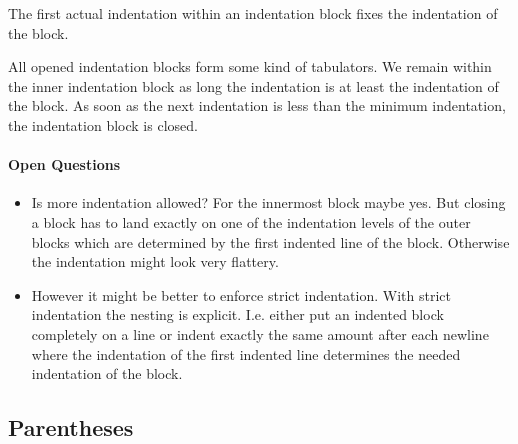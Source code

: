 The first actual indentation within an indentation block fixes the indentation
of the block.

All opened indentation blocks form some kind of tabulators. We remain within
the inner indentation block as long the indentation is at least the
indentation of the block. As soon as the next indentation is less than the
minimum indentation, the indentation block is closed.


\paragraph{Open Questions}
\begin{itemize}
\item Is more indentation allowed? For the innermost block maybe yes. But
  closing a block has to land exactly on one of the indentation levels of the
  outer blocks which are determined by the first indented line of the
  block. Otherwise the indentation might look very flattery.

\item
  However it might be better to enforce strict indentation. With strict
  indentation the nesting is explicit. I.e. either put an indented block
  completely on a line or indent exactly the same amount after each newline
  where the indentation of the first indented line determines the needed
  indentation of the block.
\end{itemize}













\subsection{Parentheses}

